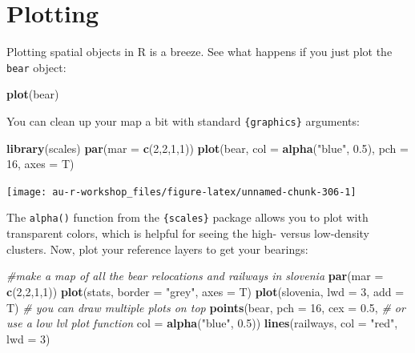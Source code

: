 \documentclass[]{book}
\newenvironment{Shaded}{\begin{snugshade}}{\end{snugshade}}
\newcommand{\CommentTok}[1]{\textcolor[rgb]{0.56,0.35,0.01}{\textit{#1}}}
\newcommand{\DataTypeTok}[1]{\textcolor[rgb]{0.13,0.29,0.53}{#1}}
\newcommand{\DecValTok}[1]{\textcolor[rgb]{0.00,0.00,0.81}{#1}}
\newcommand{\FloatTok}[1]{\textcolor[rgb]{0.00,0.00,0.81}{#1}}
\newcommand{\KeywordTok}[1]{\textcolor[rgb]{0.13,0.29,0.53}{\textbf{#1}}}
\newcommand{\NormalTok}[1]{#1}
\newcommand{\StringTok}[1]{\textcolor[rgb]{0.31,0.60,0.02}{#1}}
\begin{document}
\hypertarget{SpatPlot}{%
\section{Plotting}\label{SpatPlot}}

Plotting spatial objects in R is a breeze. See what happens if you just plot the \texttt{bear} object:

\begin{Shaded}
\begin{Highlighting}[]
\KeywordTok{plot}\NormalTok{(bear)}
\end{Highlighting}
\end{Shaded}

You can clean up your map a bit with standard \texttt{\{graphics\}} arguments:

\begin{Shaded}
\begin{Highlighting}[]
\KeywordTok{library}\NormalTok{(scales)}
\KeywordTok{par}\NormalTok{(}\DataTypeTok{mar =} \KeywordTok{c}\NormalTok{(}\DecValTok{2}\NormalTok{,}\DecValTok{2}\NormalTok{,}\DecValTok{1}\NormalTok{,}\DecValTok{1}\NormalTok{))}
\KeywordTok{plot}\NormalTok{(bear, }\DataTypeTok{col =} \KeywordTok{alpha}\NormalTok{(}\StringTok{"blue"}\NormalTok{, }\FloatTok{0.5}\NormalTok{), }\DataTypeTok{pch =} \DecValTok{16}\NormalTok{, }\DataTypeTok{axes =}\NormalTok{ T)}
\end{Highlighting}
\end{Shaded}

\begin{center}\texttt{[image: au-r-workshop\_files/figure-latex/unnamed-chunk-306-1]} \end{center}

The \texttt{alpha()} function from the \texttt{\{scales\}} package \citep{R-scales} allows you to plot with transparent colors, which is helpful for seeing the high- versus low-density clusters. Now, plot your reference layers to get your bearings:

\begin{Shaded}
\begin{Highlighting}[]
\CommentTok{#make a map of all the bear relocations and railways in slovenia}
\KeywordTok{par}\NormalTok{(}\DataTypeTok{mar =} \KeywordTok{c}\NormalTok{(}\DecValTok{2}\NormalTok{,}\DecValTok{2}\NormalTok{,}\DecValTok{1}\NormalTok{,}\DecValTok{1}\NormalTok{))}
\KeywordTok{plot}\NormalTok{(stats, }\DataTypeTok{border =} \StringTok{"grey"}\NormalTok{, }\DataTypeTok{axes =}\NormalTok{ T)}
\KeywordTok{plot}\NormalTok{(slovenia, }\DataTypeTok{lwd =} \DecValTok{3}\NormalTok{, }\DataTypeTok{add =}\NormalTok{ T)     }\CommentTok{# you can draw multiple plots on top}
\KeywordTok{points}\NormalTok{(bear, }\DataTypeTok{pch =} \DecValTok{16}\NormalTok{, }\DataTypeTok{cex =} \FloatTok{0.5}\NormalTok{,    }\CommentTok{# or use a low lvl plot function}
       \DataTypeTok{col =} \KeywordTok{alpha}\NormalTok{(}\StringTok{"blue"}\NormalTok{, }\FloatTok{0.5}\NormalTok{))}
\KeywordTok{lines}\NormalTok{(railways, }\DataTypeTok{col =} \StringTok{"red"}\NormalTok{, }\DataTypeTok{lwd =} \DecValTok{3}\NormalTok{) }
\end{Highlighting}
\end{Shaded}
\end{document}
